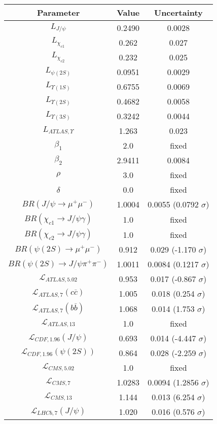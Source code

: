\begin{table}[h!]
\centering
\begin{tabular}{c|c|c}
Parameter & Value & Uncertainty \\
\hline
$L_{J/\psi}$ & 0.2490 & 0.0028 \\
$L_{\chi_{c1}}$ & 0.262 & 0.027 \\
$L_{\chi_{c2}}$ & 0.232 & 0.025 \\
$L_{\psi(2S)}$ & 0.0951 & 0.0029 \\
$L_{\Upsilon(1S)}$ & 0.6755 & 0.0069 \\
$L_{\Upsilon(2S)}$ & 0.4682 & 0.0058 \\
$L_{\Upsilon(3S)}$ & 0.3242 & 0.0044 \\
$L_{ATLAS,\Upsilon}$ & 1.263 & 0.023 \\
$\beta_1$ & 2.0 & fixed \\
$\beta_2$ & 2.9411 & 0.0084 \\
$\rho$ & 3.0 & fixed \\
$\delta$ & 0.0 & fixed \\
$BR(J/\psi\rightarrow\mu^+\mu^-)$ & 1.0004 & 0.0055 (0.0792 $\sigma$) \\
$BR(\chi_{c1}\rightarrow J/\psi\gamma)$ & 1.0 & fixed \\
$BR(\chi_{c2}\rightarrow J/\psi\gamma)$ & 1.0 & fixed \\
$BR(\psi(2S)\rightarrow\mu^+\mu^-)$ & 0.912 & 0.029 (-1.170 $\sigma$) \\
$BR(\psi(2S)\rightarrow J/\psi\pi^+\pi^-)$ & 1.0011 & 0.0084 (0.1217 $\sigma$) \\
$\mathcal L_{ATLAS,5.02}$ & 0.953 & 0.017 (-0.867 $\sigma$) \\
$\mathcal L_{ATLAS,7}(c\overline c)$ & 1.005 & 0.018 (0.254 $\sigma$) \\
$\mathcal L_{ATLAS,7}(b\overline b)$ & 1.068 & 0.014 (1.753 $\sigma$) \\
$\mathcal L_{ATLAS,13}$ & 1.0 & fixed \\
$\mathcal L_{CDF,1.96}(J/\psi)$ & 0.693 & 0.014 (-4.447 $\sigma$) \\
$\mathcal L_{CDF,1.96}(\psi(2S))$ & 0.864 & 0.028 (-2.259 $\sigma$) \\
$\mathcal L_{CMS,5.02}$ & 1.0 & fixed \\
$\mathcal L_{CMS,7}$ & 1.0283 & 0.0094 (1.2856 $\sigma$) \\
$\mathcal L_{CMS,13}$ & 1.144 & 0.013 (6.254 $\sigma$) \\
$\mathcal L_{LHCb,7}(J/\psi)$ & 1.020 & 0.016 (0.576 $\sigma$) \\

\end{tabular}
\end{table}
